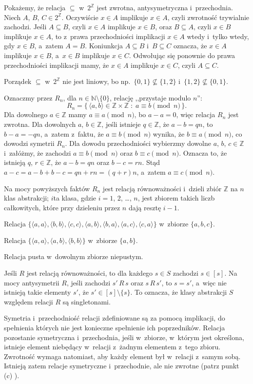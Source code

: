 
\exercise %
Pokażemy, że relacja $\subseteq$ w~$2^\mathbb{Z}$ jest zwrotna, antysymetryczna i~przechodnia.
Niech $A$, $B$, $C\in2^\mathbb{Z}$.
Oczywiście $x\in A$ implikuje $x\in A$, czyli zwrotność trywialnie zachodzi.
Jeśli $A\subseteq B$, czyli $x\in A$ implikuje $x\in B$, oraz $B\subseteq A$, czyli $x\in B$ implikuje $x\in A$, to z~prawa przechodniości implikacji $x\in A$ wtedy i~tylko wtedy, gdy $x\in B$, a~zatem $A=B$.
Koniunkcja $A\subseteq B$ i~$B\subseteq C$ oznacza, że $x\in A$ implikuje $x\in B$, a~$x\in B$ implikuje $x\in C$.
Odwołując się ponownie do prawa przechodniości implikacji mamy, że $x\in A$ implikuje $x\in C$, czyli $A\subseteq C$.

Porządek $\subseteq$ w~$2^\mathbb{Z}$ nie jest liniowy, bo np.\ $\{0,1\}\nsubseteq\{1,2\}$ i~$\{1,2\}\nsubseteq\{0,1\}$.

\exercise %
Oznaczmy przez $R_n$, dla $n\in\mathbb{N}\setminus\{0\}$, relację ,,przystaje modulo $n$'':
\[
	R_n = \{\,\langle a,b\rangle\in\mathbb{Z}\times\mathbb{Z}\;:\;a\equiv b\!\!\!\pmod{n}\,\}.
\]
Dla dowolnego $a\in\mathbb{Z}$ mamy $a\equiv a\pmod{n}$, bo $a-a=0$, więc relacja $R_n$ jest zwrotna.
Dla dowolnych $a$, $b\in\mathbb{Z}$, jeśli istnieje $q\in\mathbb{Z}$, że $a-b=qn$, to $b-a=-qn$, a~zatem z~faktu, że $a\equiv b\pmod{n}$ wynika, że $b\equiv a\pmod{n}$, co dowodzi symetrii $R_n$.
Dla dowodu przechodniości wybierzmy dowolne $a$, $b$, $c\in\mathbb{Z}$ i~załóżmy, że zachodzi $a\equiv b\pmod{n}$ oraz $b\equiv c\pmod{n}$.
Oznacza to, że istnieją $q$, $r\in\mathbb{Z}$, że $a-b=qn$ oraz $b-c=rn$.
Stąd $a-c=a-b+b-c=qn+rn=(q+r)n$, a~zatem $a\equiv c\pmod{n}$.

Na mocy powyższych faktów $R_n$ jest relacją równoważności i~dzieli zbiór $\mathbb{Z}$ na $n$ klas abstrakcji; $i$\nbhyphen ta klasa, gdzie $i=1$, 2, \dots, $n$, jest zbiorem takich liczb całkowitych, które przy dzieleniu przez $n$ dają resztę $i-1$.

\exercise %
\subexercise
Relacja $\{\langle a,a\rangle,\langle b,b\rangle,\langle c,c\rangle,\langle a,b\rangle,\langle b,a\rangle,\langle a,c\rangle,\langle c,a\rangle\}$ w~zbiorze $\{a,b,c\}$.

\subexercise
Relacja $\{\langle a,a\rangle, \langle a,b\rangle,\langle b,b\rangle\}$ w~zbiorze $\{a,b\}$.

\subexercise
Relacja pusta w~dowolnym zbiorze niepustym.

\exercise %
Jeśli $R$ jest relacją równoważności, to dla każdego $s\in S$ zachodzi $s\in[s]$.
Na mocy antysymetrii $R$, jeśli zachodzi $s'\,R\,s$ oraz $s\,R\,s'$, to $s=s'$, a~więc nie istnieją takie elementy $s'$, że $s'\in[s]\setminus\{s\}$.
To oznacza, że klasy abstrakcji $S$ względem relacji $R$ są singletonami.

\exercise %
Symetria i~przechodniość relacji zdefiniowane są za pomocą implikacji, do spełnienia których nie jest konieczne spełnienie ich poprzedników.
Relacja pozostanie symetryczna i~przechodnia, jeśli w~zbiorze, w~którym jest określona, istnieje element niebędący w~relacji z~żadnym elementem z~tego zbioru.
Zwrotność wymaga natomiast, aby każdy element był w~relacji z~samym sobą.
Istnieją zatem relacje symetryczne i~przechodnie, ale nie zwrotne (patrz punkt (c) ).
